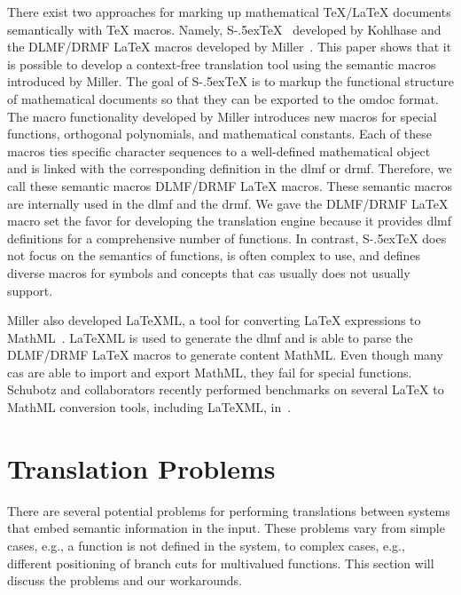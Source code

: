 \documentclass[a4paper,11pt]{article}
\newcommand{\DLMF}{DLMF}
\newcommand{\DRMF}{DRMF}
\newcommand{\Macro}{\DLMF/\DRMF{} \LaTeX{} macro}
\newcommand{\sTeX}{{\raisebox{-.5ex}S\kern-.5ex\TeX}}
\theoremstyle{defTheoStyle}
\theoremstyle{defExampStyle}
\begin{document}
	There exist two approaches for marking up mathematical \TeX/\LaTeX{} documents semantically with \TeX{} macros. Namely, \sTeX{}~\parencite{sTeX} developed by Kohlhase and the \Macro s developed by Miller~\parencite{DLMF:Macros}. This paper shows that it is possible to develop a context-free translation tool using  the semantic macros introduced by Miller. The goal of \sTeX{} is to markup the functional structure of mathematical documents so that they can be exported to the \gls*{omdoc} format. The macro functionality developed by Miller introduces new macros for special functions, orthogonal polynomials, and mathematical constants. Each of these macros ties specific character sequences to a well-defined mathematical object and is linked with the corresponding definition in the \gls*{dlmf} or \gls*{drmf}. Therefore, we call these semantic macros \Macro s. These semantic macros are internally used in the \gls*{dlmf} and the \gls*{drmf}. We gave the \Macro{} set the favor for developing the translation engine because it provides \gls*{dlmf} definitions for a comprehensive number of functions. In contrast, \sTeX{} does not focus on the semantics of functions, is often complex to use, and defines diverse macros for symbols and concepts that \gls*{cas} usually does not usually support.
	
	Miller also developed LaTeXML, a tool for converting \LaTeX{} expressions to MathML~\parencite{LaTeXML}. LaTeXML is used to generate the \gls*{dlmf} and is able to parse the \Macro s to generate content MathML. Even though many \gls*{cas} are able to import and export MathML, they fail for special functions. Schubotz and collaborators recently performed benchmarks on several \LaTeX{} to MathML conversion tools, including LaTeXML, in~\parencite{DBLP:conf/jcdl/SchubotzGSMCG18}.
	
	\section{Translation Problems}\label{sec:problems}
	There are several potential problems for performing translations between systems that embed semantic information in the input. These problems vary from simple cases, e.g., a function is not defined in the system, to complex cases, e.g., different positioning of branch cuts for multivalued functions. This section will discuss the problems and our workarounds.
	
\end{document}
